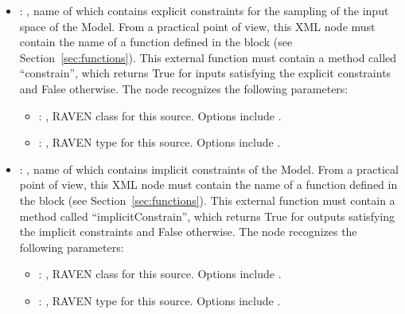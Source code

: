 \begin{itemize}
    \item {}: ,
      name of  which contains explicit constraints for the sampling of
      the input space of the Model. From a practical point of view, this XML node must contain
      the name of a function defined in the  block (see
      Section~\ref{sec:functions}).               This external function must contain a method
      called ``constrain'', which returns True for               inputs satisfying the explicit
      constraints and False otherwise.
      The  node recognizes the following parameters:
        \begin{itemize}
          \item {}: ,
            RAVEN class for this source. Options include .
          \item {}: ,
            RAVEN type for this source. Options include .
      \end{itemize}

    \item {}: ,
      name of  which contains implicit constraints of the Model. From a practical
      point of view, this XML node must contain the name of a function defined in the
                     block (see Section~\ref{sec:functions}). This external
      function must contain a method called               ``implicitConstrain'', which returns True
      for outputs satisfying the implicit constraints and False otherwise.
      The  node recognizes the following parameters:
        \begin{itemize}
          \item {}: ,
            RAVEN class for this source. Options include .
          \item {}: ,
            RAVEN type for this source. Options include .
      \end{itemize}


\end{itemize}
